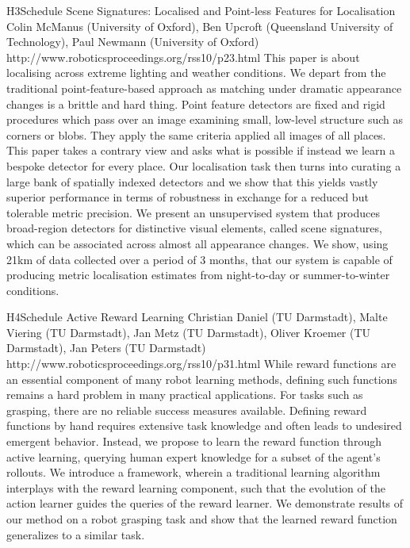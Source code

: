 \begin{spacing}{1.0}
\descriptionPaper
{H3}{Schedule}
{	
Scene Signatures: Localised and Point-less Features for Localisation
}
{
Colin McManus (University of Oxford), Ben Upcroft (Queensland University of Technology), Paul Newmann (University of Oxford)
}
{
http://www.roboticsproceedings.org/rss10/p23.html
}
{
This paper is about localising across extreme lighting and weather conditions. We depart from the traditional point-feature-based approach as matching under dramatic appearance changes is a brittle and hard thing. Point feature detectors are fixed and rigid procedures which pass over an image examining small, low-level structure such as corners or blobs. They apply the same criteria applied all images of all places. This paper takes a contrary view and asks what is possible if instead we learn a bespoke detector for every place. Our localisation task then turns into curating a large bank of spatially indexed detectors and we show that this yields vastly superior performance in terms of robustness in exchange for a reduced but tolerable metric precision. We present an unsupervised system that produces broad-region detectors for distinctive visual elements, called scene signatures, which can be associated across almost all appearance changes. We show, using 21km of data collected over a period of 3 months, that our system is capable of producing metric localisation estimates from night-to-day or summer-to-winter conditions.
}


\clearpage
\descriptionPaper
{H4}{Schedule}
{	
Active Reward Learning 
}
{
Christian Daniel (TU Darmstadt), Malte Viering (TU Darmstadt), Jan Metz (TU Darmstadt), Oliver Kroemer (TU Darmstadt), Jan Peters (TU Darmstadt)
}
{
http://www.roboticsproceedings.org/rss10/p31.html
}
{
While reward functions are an essential component of many robot learning methods, defining such functions remains a hard problem in many practical applications. For tasks such as grasping, there are no reliable success measures available. Defining reward functions by hand requires extensive task knowledge and often leads to undesired emergent behavior. Instead, we propose to learn the reward function through active learning, querying human expert knowledge for a subset of the agent's rollouts. We introduce a framework, wherein a traditional learning algorithm interplays with the reward learning component, such that the evolution of the action learner guides the queries of the reward learner. We demonstrate results of our method on a robot grasping task and show that the learned reward function generalizes to a similar task.
}




\end{spacing}
